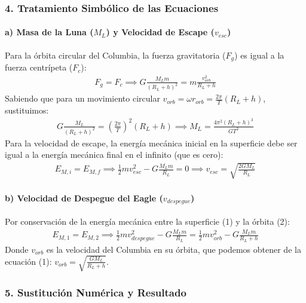 \subsubsection*{4. Tratamiento Simbólico de las Ecuaciones}
\paragraph*{a) Masa de la Luna ($M_L$) y Velocidad de Escape ($v_{esc}$)}
Para la órbita circular del Columbia, la fuerza gravitatoria ($F_g$) es igual a la fuerza centrípeta ($F_c$):
\begin{gather}
    F_g = F_c \implies G \frac{M_L m}{(R_L+h)^2} = m \frac{v_{orb}^2}{R_L+h}
\end{gather}
Sabiendo que para un movimiento circular $v_{orb} = \omega r_{orb} = \frac{2\pi}{T}(R_L+h)$, sustituimos:
\begin{gather}
    G \frac{M_L}{(R_L+h)^2} = \left(\frac{2\pi}{T}\right)^2 (R_L+h) \implies M_L = \frac{4\pi^2 (R_L+h)^3}{G T^2}
\end{gather}
Para la velocidad de escape, la energía mecánica inicial en la superficie debe ser igual a la energía mecánica final en el infinito (que es cero):
\begin{gather}
    E_{M,i} = E_{M,f} \implies \frac{1}{2} m v_{esc}^2 - G \frac{M_L m}{R_L} = 0 \implies v_{esc} = \sqrt{\frac{2 G M_L}{R_L}}
\end{gather}
\paragraph*{b) Velocidad de Despegue del Eagle ($v_{despegue}$)}
Por conservación de la energía mecánica entre la superficie (1) y la órbita (2):
\begin{gather}
    E_{M,1} = E_{M,2} \implies \frac{1}{2} m v_{despegue}^2 - G \frac{M_L m}{R_L} = \frac{1}{2} m v_{orb}^2 - G \frac{M_L m}{R_L+h}
\end{gather}
Donde $v_{orb}$ es la velocidad del Columbia en su órbita, que podemos obtener de la ecuación (1): $v_{orb} = \sqrt{\frac{G M_L}{R_L+h}}$.

\subsubsection*{5. Sustitución Numérica y Resultado}
